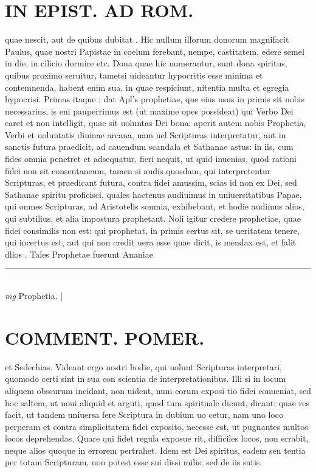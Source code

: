 \documentclass{article}
\begin{document}
\begin{pages}
\section*{IN EPIST. AD ROM.  }
\marginpar{[ p.144 ]}\pstart quae nescit, aut de quibus dubitat . Hic nullum illorum donorum magnifacit Paulus, quae nostri Papistae in coelum ferebant, nempe, castitatem, edere semel in die, in cilicio dormire etc. Dona quae hic numerantur, sunt dona spiritus, quibus proximo seruitur, tametsi uideantur hypocritis esse minima et contemnenda, habent enim sua, in quae respiciunt, nitentia multa et egregia hypocrisi. Primas itaque ; dat Apl's prophetiae, que eius usus in primis sit nobis necessarius, is eni pauperrimus est (ut maxime opes possideat) qui Verbo Dei caret et non intelligit, quae sit uoluntas Dei bona: aperit autem nobis Prophetia, Verbi et uoluntatis diuinae arcana, nam uel Scripturas interpretatur, aut in sanctis futura praedicit, ad cauendum scandala et Sathanae astus: in iis, cum fides omnia penetret et adsequatur, fieri nequit, ut quid inuenias, quod rationi fidei non sit consentaneum, tamen si audis quosdam, qui interpretentur Scripturas, et praedicant futura, contra fidei amussim, scias id non ex Dei, sed Sathanae spiritu proficisci, quales hactenus audiuimus in uniuersitatibus Papae, qui omnes Scripturas, ad Aristotelis somnia, exhibebant, et hodie audimus alios, qui subtilius, et alia impostura prophetant. Noli igitur credere prophetiae, quae fidei consimilis non est: qui prophetat, in primis certus sit, se ueritatem tenere, qui incertus est, aut qui non credit uera esse quae dicit, is mendax est, et falit dlios . Tales Prophetae fuerunt Ananiae  \pend
\vspace{0.5cm}\noindent
\vspace{0.2cm}\rule{1cm}{0.2pt}\\ 
\hspace{0.2cm}\textit{mg}
\footnotesize Prophetia.  
\normalsize| 
\section*{COMMENT. POMER.  }\pstart et Sedechias. Videant ergo nostri hodie, qui uolunt Scripturas interpretari, quomodo certi sint in sua con scientia de interpretationibus. Illi si in locum aliquem obscurum incidant, non uident, num eorum exposi tio fidei conueniat, sed hoc saltem, ut noui aliquid et arguti, quod tum spirituale dicunt, dicant: quae res facit, ut tandem uniuersa fere Scriptura in dubium uo cetur, nam uno loco perperam et contra simplicitatem fidei exposito, necesse est, ut pugnantes multos locos deprehendas. Quare qui fidet regula exposue rit, difficiles locos, non errabit, neque alios quoque in errorem pertrahet. Idem est Dei spiritus, eadem sen tentia per totam Scripturam, non potest esse sui dissi milis: sed de iis satis.  \pend
{}
{}

\end{pages}
\end{document}
